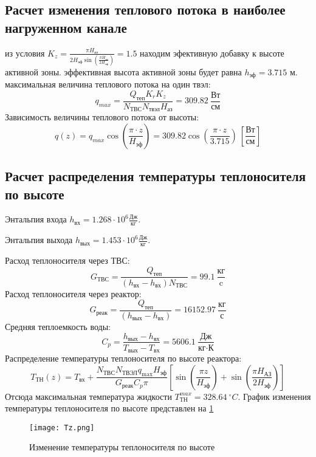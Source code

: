 \subsection{Расчет изменения теплового потока в наиболее нагруженном канале}
из условия $K_z = \frac {\pi H_{\text{аз}}} {2 H_{\text{эф}} \sin \left(\frac {\pi H_{\text{аз}}}{2H_{\text{эф}}}\right)}  = 1.5$ находим эфективную добавку к высоте активной зоны. эффективная высота активной зоны будет равна $h_{\text{эф}} = 3.715$ м. максимальная величина теплового потока на один твэл:
$$
q_{max} = \frac {Q_{\text{теп}}K_r K_z}{N_{ТВС}N_{\text{твэл}}H_{\text{аз}}} = 309.82\  \frac {\text{Вт}} {\text{см}}
$$ 
Зависимость величины теплового потока от высоты:
$$
q(z) = q_{max}\cos\left(\frac {\pi\cdot z} {H_{\text{эф}}}\right) = 309.82 \cos \left(\frac {\pi \cdot z} {3.715} \right)\ \left[\frac{\text{Вт}}{\text{см}} \right]
$$

\subsection{Расчет распределения температуры теплоносителя по высоте}

Энтальпия входа $h_{\text{вх}} =1.268 \cdot 10^6 \frac{Дж}{кг}$.%

\noindent Энтальпия выхода $h_{\text{вых}} =1.453 \cdot 10^6 \frac{Дж}{кг}$. %

\noindent Расход теплоносителя через ТВС:
$$
G_{ТВС} = \frac {Q_{\text{теп}}} {(h_{\text{вх}} - h_{\text{вх}})N_{\text{ТВС}}} = 99.1 \ \frac {\text{кг}}{\text{c}} 
$$
Расход теплоносителя через реактор:
$$
G_{\text{реак}} = \frac {Q_{\text{теп}}} {\left(h_{\text{вых}} - h_{\text{вх}}\right)} = 16152.97\ \frac{\text{кг}} {\text{с}}
$$
Средняя теплоемкость воды:
$$
C_p = \frac {h_{\text{вых}} - h_{\text{вх}}} {T_{\text{вых}} - T_{\text{вх}}} = 5606.1\ \frac{\text{Дж}} {\text{кг} \cdot \text{К}}
$$
\noindent Распределение температуры теплоносителя по высоте реактора:
$$
T_{ТН}(z) = T_{\text{вх}} + \frac {N_{\text{ТВС}}N_{\text{ТВЭЛ}}q_{\max}H_{\text{эф}}} {G_{\text{реак}}C_p\pi}\left[\sin \left(\frac {\pi z}{H_{\text{эф}}} \right) +\sin \left(\frac {\pi H_{\text{АЗ}}} {2H_{\text{эф}}} \right) \right]
$$
\noindent Отсюда максимальная температура жидкости $T_{\text{ТН}}^{max} = 328.64\  ^\circ C$.
График изменения температуры теплоносителя по высоте представлен на \ref{pic:TZ}

\begin{figure}[H]
	\begin{center}
		\texttt{[image: Tz.png]}
		\caption{Изменение температуры теплоносителя по высоте}
		\label{pic:TZ} %
	\end{center}
\end{figure}

